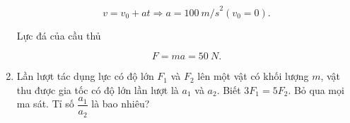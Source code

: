 \begin{enumerate}[label=\bfseries Câu \arabic*:]
{		$$v = v_0 + at \Rightarrow a = \SI{100}{m/s}^2 (v_0 = 0).$$
		
		Lực đá của cầu thủ
		
		$$F = ma = \SI{50}{N}.$$
		
		
		
	}
	\item {}
	
	{
		
		Lần lượt tác dụng lực có độ lớn $F_1$ và $F_2$ lên một vật có khối lượng $m$, vật thu được gia tốc có độ lớn lần lượt là $a_1$ và $a_2$. Biết $3F_1 = 5F_2$. Bỏ qua mọi ma sát. Tỉ số $\dfrac{a_1}{a_2}$ là bao nhiêu?
	}
	
	
\end{enumerate}